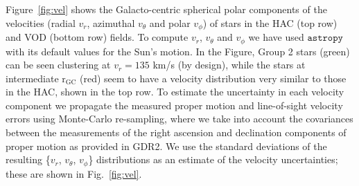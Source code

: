 \documentclass[fleqn,usenatbib]{mnras}
\begin{document}
Figure~\ref{fig:vel} shows the Galacto-centric spherical polar
components of the velocities (radial $v_{r}$, azimuthal $v_{\theta}$
and polar $v_{\phi}$) of stars in the HAC (top row) and VOD (bottom
row) fields. To compute $v_{r}$, $v_{\theta}$ and $v_{\phi}$ we have
used $\texttt{astropy}$ \citep{astropy} with its default values for
the Sun's motion. In the Figure, Group 2 stars (green) can be seen
clustering at $v_{r} = 135$ km/s (by design), while the stars at
intermediate $\mathrm{r_{GC}}$ (red) seem to have a velocity
distribution very similar to those in the HAC, shown in the top
row. To estimate the uncertainty in each velocity component we
propagate the measured proper motion and line-of-sight velocity errors
using Monte-Carlo re-sampling, where we take into account the
covariances between the measurements of the right ascension and
declination components of proper motion as provided in GDR2. We use
the standard deviations of the resulting \{$v_{r}$, $v_{\theta}$,
$v_{\phi}$\} distributions as an estimate of the velocity
uncertainties; these are shown in Fig.~\ref{fig:vel}.
%
%
\end{document}
